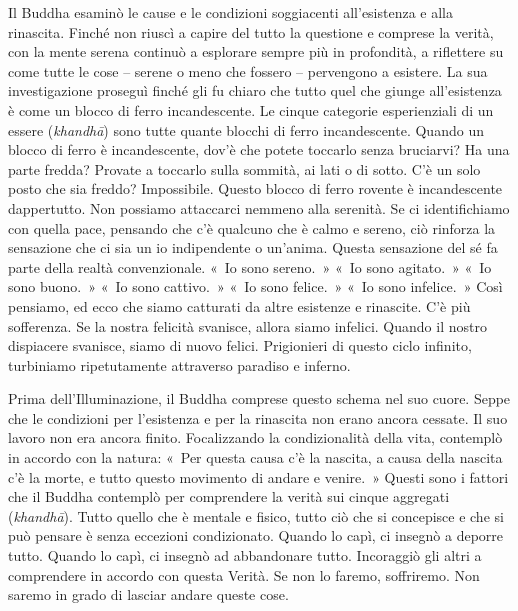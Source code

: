 Il Buddha esaminò le cause e le condizioni soggiacenti all'esistenza e
alla rinascita. Finché non riuscì a capire del tutto la questione e
comprese la verità, con la mente serena continuò a esplorare sempre più
in profondità, a riflettere su come tutte le cose -- serene o meno che
fossero -- pervengono a esistere. La sua investigazione proseguì finché
gli fu chiaro che tutto quel che giunge all'esistenza è come un blocco
di ferro incandescente. Le cinque categorie esperienziali di un essere
(\emph{khandhā}) sono tutte quante blocchi di ferro incandescente.
Quando un blocco di ferro è incandescente, dov'è che potete toccarlo
senza bruciarvi? Ha una parte fredda? Provate a toccarlo sulla sommità,
ai lati o di sotto. C'è un solo posto che sia freddo? Impossibile.
Questo blocco di ferro rovente è incandescente dappertutto. Non possiamo
attaccarci nemmeno alla serenità. Se ci identifichiamo con quella pace,
pensando che c'è qualcuno che è calmo e sereno, ciò rinforza la
sensazione che ci sia un io indipendente o un'anima. Questa sensazione
del sé fa parte della realtà convenzionale. «~Io sono sereno.~» «~Io
sono agitato.~» «~Io sono buono.~» «~Io sono cattivo.~» «~Io sono
felice.~» «~Io sono infelice.~» Così pensiamo, ed ecco che siamo
catturati da altre esistenze e rinascite. C'è più sofferenza. Se la
nostra felicità svanisce, allora siamo infelici. Quando il nostro
dispiacere svanisce, siamo di nuovo felici. Prigionieri di questo ciclo
infinito, turbiniamo ripetutamente attraverso paradiso e inferno.

Prima dell'Illuminazione, il Buddha comprese questo schema nel suo
cuore. Seppe che le condizioni per l'esistenza e per la rinascita non
erano ancora cessate. Il suo lavoro non era ancora finito. Focalizzando
la condizionalità della vita, contemplò in accordo con la natura: «~Per
questa causa c'è la nascita, a causa della nascita c'è la morte, e tutto
questo movimento di andare e venire.~» Questi sono i fattori che il
Buddha contemplò per comprendere la verità sui cinque aggregati
(\emph{khandhā}). Tutto quello che è mentale e fisico, tutto ciò che si
concepisce e che si può pensare è senza eccezioni condizionato. Quando
lo capì, ci insegnò a deporre tutto. Quando lo capì, ci insegnò ad
abbandonare tutto. Incoraggiò gli altri a comprendere in accordo con
questa Verità. Se non lo faremo, soffriremo. Non saremo in grado di
lasciar andare queste cose.

